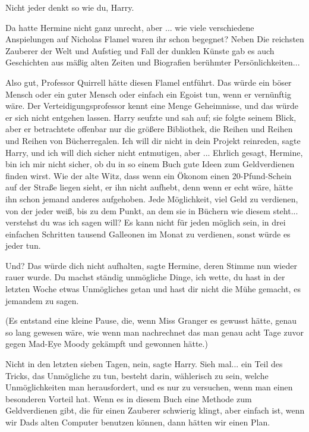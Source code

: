 \glqq Nicht jeder denkt so wie du, Harry.\grqq{}

Da hatte Hermine nicht ganz unrecht, aber ... wie viele verschiedene
Anspielungen auf Nicholas Flamel waren ihr schon begegnet? Neben \glqq Die
reichsten Zauberer der Welt\grqq{} und \glqq Aufstieg und Fall der dunklen
Künste\grqq{} gab es auch \glqq Geschichten aus mäßig alten Zeiten\grqq{} und
\glqq Biografien berühmter Persönlichkeiten\grqq{}...

\glqq Also gut, Professor Quirrell hätte diesen Flamel entführt. Das würde ein
böser Mensch oder ein guter Mensch oder einfach ein Egoist tun, wenn er
vernünftig wäre. Der Verteidigungsprofessor kennt eine Menge Geheimnisse, und
das würde er sich nicht entgehen lassen.\grqq{} Harry seufzte und sah auf; sie
folgte seinem Blick, aber er betrachtete offenbar nur die größere Bibliothek,
die Reihen und Reihen und Reihen von Bücherregalen. \glqq Ich will dir nicht in
dein Projekt reinreden\grqq{}, sagte Harry, \glqq und ich will dich sicher nicht
entmutigen, aber ... Ehrlich gesagt, Hermine, bin ich mir nicht sicher, ob du in
so einem Buch gute Ideen zum Geldverdienen finden wirst. Wie der alte Witz, dass
wenn ein Ökonom einen 20-Pfund-Schein auf der Straße liegen sieht, er ihn nicht
aufhebt, denn wenn er echt wäre, hätte ihn schon jemand anderes aufgehoben. Jede
Möglichkeit, viel Geld zu verdienen, von der jeder weiß, bis zu dem Punkt, an
dem sie in Büchern wie diesem steht... verstehst du was ich sagen will? Es kann
nicht für jeden möglich sein, in drei einfachen Schritten tausend Galleonen im
Monat zu verdienen, sonst würde es jeder tun.\grqq{}

\glqq Und? Das würde dich nicht aufhalten\grqq{}, sagte Hermine, deren Stimme
nun wieder rauer wurde. \glqq Du machst ständig unmögliche Dinge, ich wette, du
hast in der letzten Woche etwas Unmögliches getan und hast dir nicht die Mühe
gemacht, es jemandem zu sagen.\grqq{}

(Es entstand eine kleine Pause, die, wenn Miss Granger es gewusst hätte, genau
so lang gewesen wäre, wie wenn man nachrechnet das man genau acht Tage zuvor
gegen Mad-Eye Moody gekämpft und gewonnen hätte.)

\glqq Nicht in den letzten sieben Tagen, nein\grqq{}, sagte Harry. \glqq Sieh
mal... ein Teil des Tricks, das Unmögliche zu tun, besteht darin, wählerisch zu
sein, welche Unmöglichkeiten man herausfordert, und es nur zu versuchen, wenn
man einen besonderen Vorteil hat. Wenn es in diesem Buch eine Methode zum
Geldverdienen gibt, die für einen Zauberer schwierig klingt, aber einfach ist,
wenn wir Dads alten Computer benutzen können, dann hätten wir einen Plan.\grqq{}

